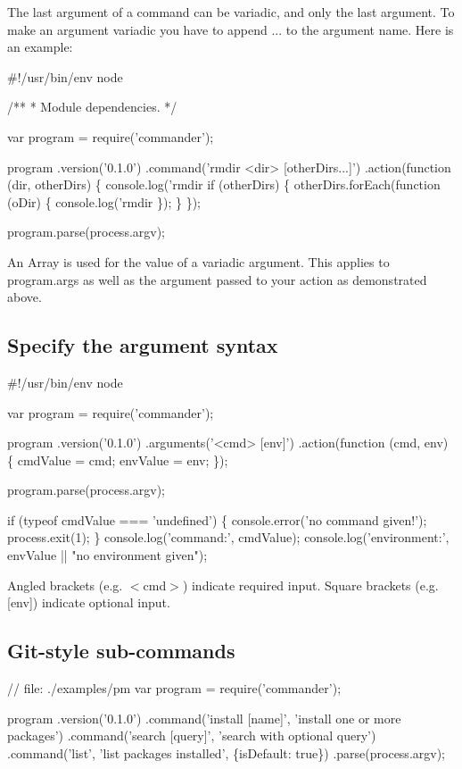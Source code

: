 The last argument of a command can be variadic, and only the last argument. To make an argument variadic you have to append {\ttfamily ...} to the argument name. Here is an example\+:


\begin{DoxyCode}
#!/usr/bin/env node

/**
 * Module dependencies.
 */

var program = require('commander');

program
  .version('0.1.0')
  .command('rmdir <dir> [otherDirs...]')
  .action(function (dir, otherDirs) \{
    console.log('rmdir %
    if (otherDirs) \{
      otherDirs.forEach(function (oDir) \{
        console.log('rmdir %
      \});
    \}
  \});

program.parse(process.argv);
\end{DoxyCode}


An {\ttfamily Array} is used for the value of a variadic argument. This applies to {\ttfamily program.\+args} as well as the argument passed to your action as demonstrated above.

\subsection*{Specify the argument syntax}


\begin{DoxyCode}
#!/usr/bin/env node

var program = require('commander');

program
  .version('0.1.0')
  .arguments('<cmd> [env]')
  .action(function (cmd, env) \{
     cmdValue = cmd;
     envValue = env;
  \});

program.parse(process.argv);

if (typeof cmdValue === 'undefined') \{
   console.error('no command given!');
   process.exit(1);
\}
console.log('command:', cmdValue);
console.log('environment:', envValue || "no environment given");
\end{DoxyCode}
 Angled brackets (e.\+g. {\ttfamily $<$cmd$>$}) indicate required input. Square brackets (e.\+g. {\ttfamily \mbox{[}env\mbox{]}}) indicate optional input.

\subsection*{Git-\/style sub-\/commands}


\begin{DoxyCode}
// file: ./examples/pm
var program = require('commander');

program
  .version('0.1.0')
  .command('install [name]', 'install one or more packages')
  .command('search [query]', 'search with optional query')
  .command('list', 'list packages installed', \{isDefault: true\})
  .parse(process.argv);
\end{DoxyCode}


